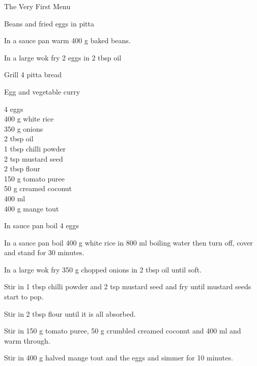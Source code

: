 \begin{menu}{The Very First Menu}
\begin{recipe}{1}{Beans and fried eggs in pitta}
    \begin{instructions}
    \item 
        In a sauce pan warm
        400 g  baked beans.
      \item 
        In a large wok fry
        2   eggs
        in
        2 tbsp  oil\item 
        Grill
        4   pitta bread
    \end{instructions}
    \end{recipe}%
  
    \begin{recipe}{2}{Egg and vegetable curry}%
    
	
		\begin{ingredients}
		4  eggs  \\
	400 g white rice  \\
	350 g onions  \\
	2 tbsp oil  \\
	1 tbsp chilli powder  \\
	2 tsp mustard seed  \\
	2 tbsp flour  \\
	150 g tomato puree  \\
	50 g creamed coconut  \\
	400 ml   \\
	400 g mange tout  \\
	
		\end{ingredients}
	
    \begin{instructions}
    \item 
        In sauce pan boil
        4   eggs\item 
      In a 
      sauce pan 
      boil 
      400 g  white rice
      in 
      800 ml  boiling water
      then turn off, cover and stand for 30 minutes.
    \item 
        In a large wok fry
        350 g chopped onions
        in
        2 tbsp  oil
        until soft.
      \item 
        Stir in 1 tbsp  chilli powder
        and
        2 tsp  mustard seed
        and fry until mustard seeds start to pop.
      \item 
        Stir in
        2 tbsp  flour
        until it is all absorbed.
      \item 
        Stir in
        150 g  tomato puree,
        50 g crumbled creamed coconut
        and
        400 ml  
        and warm through.
      \item 
        Stir in
        400 g halved mange tout
        and the eggs
        and simmer for 10 minutes.
      

\end{instructions}
\end{recipe}
\end{menu}
